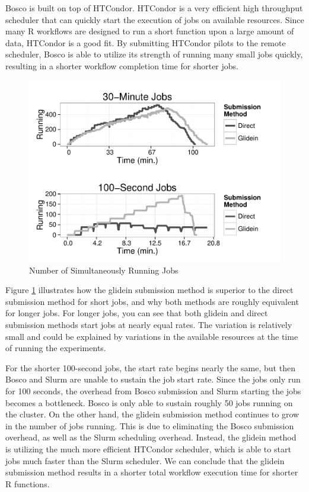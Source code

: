 Bosco is built on top of HTCondor.  HTCondor is a very efficient high throughput scheduler that can quickly start the execution of jobs on available resources.  Since many R workflows are designed to run a short function upon a large amount of data, HTCondor is a good fit.  By submitting HTCondor pilots to the remote scheduler, Bosco is able to utilize its strength of running many small jobs quickly, resulting in a shorter workflow completion time for shorter jobs.

\begin{figure}[h!t]
\centering
\includegraphics[width=\textwidth]{BoscoRImages/NumberRunning-color.pdf}

\caption{Number of Simultaneously Running Jobs}
\label{fig:runningjobs}
\end{figure}

Figure \ref{fig:runningjobs} illustrates how the glidein submission method is superior to the direct submission method for short jobs, and why both methods are roughly equivalent for longer jobs.  For longer jobs, you can see that both glidein and direct submission methods start jobs at nearly equal rates.  The variation is relatively small and could be explained by variations in the available resources at the time of running the experiments. 

For the shorter 100-second jobs, the start rate begins nearly the same, but then Bosco and Slurm are unable to sustain the job start rate.  Since the jobs only run for 100 seconds, the overhead from Bosco submission and Slurm starting the jobs becomes a bottleneck.  Bosco is only able to sustain roughly 50 jobs running on the cluster.  On the other hand, the glidein submission method continues to grow in the number of jobs running.  This is due to eliminating the Bosco submission overhead, as well as the Slurm scheduling overhead.  Instead, the glidein method is utilizing the much more efficient HTCondor scheduler, which is able to start jobs much faster than the Slurm scheduler.  We can conclude that the glidein submission method results in a shorter total workflow execution time for shorter R functions.



